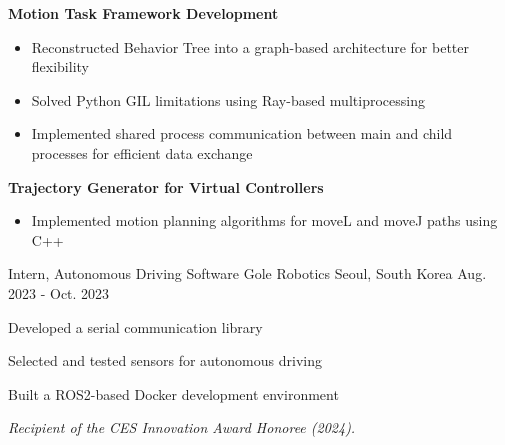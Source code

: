 \begin{cventries}
{\begin{cvitems}
{        }
        \item {\textbf{Motion Task Framework Development}
          \begin{itemize}[leftmargin=2ex, nosep, noitemsep]
            \setlength{\parskip}{0pt}
            \renewcommand{\labelitemi}{\bullet}
            \item {Reconstructed Behavior Tree into a graph-based architecture for better flexibility}
            \item {Solved Python GIL limitations using Ray-based multiprocessing}
            \item {Implemented shared process communication between main and child processes for efficient data exchange}
          \end{itemize}
        }
        \item {\textbf{Trajectory Generator for Virtual Controllers}
          \begin{itemize}[leftmargin=2ex, nosep, noitemsep]
            \setlength{\parskip}{0pt}
            \renewcommand{\labelitemi}{\bullet}
            \item {Implemented motion planning algorithms for moveL and moveJ paths using C++}
          \end{itemize}
        }
      \end{cvitems}
    }

  \cventry
    {Intern, Autonomous Driving Software} %
    {Gole Robotics} %
    {Seoul, South Korea} %
    {Aug. 2023 - Oct. 2023} %
    {
      \begin{cvitems} %
        \item {Developed a serial communication library}
        \item {Selected and tested sensors for autonomous driving}
        \item {Built a ROS2-based Docker development environment}
        \item {\textit{Recipient of the CES Innovation Award Honoree (2024).}}
      \end{cvitems}
    }


\end{cventries}
